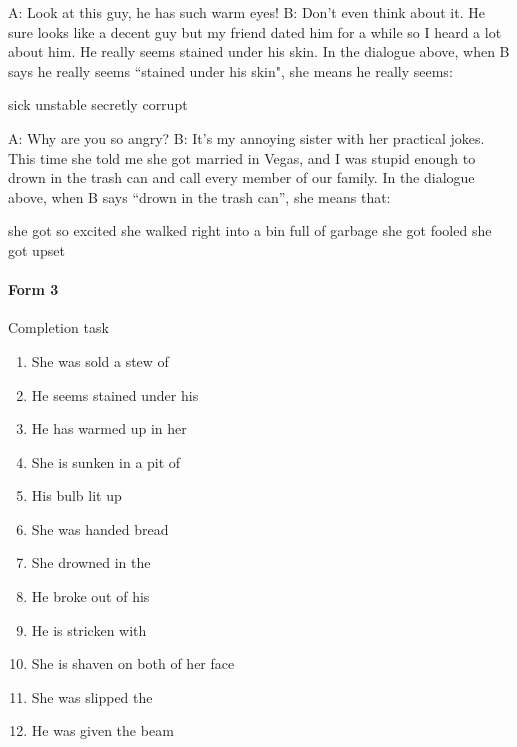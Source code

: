 \documentclass[output=paper]{langsci/langscibook}
\begin{document}
\begin{subappendices}
{\begin{exe}
\begin{xlist}
        \sn A: Look at this guy, he has such warm eyes!
        \sn B: Don't even think about it. He sure looks like a decent guy but my friend dated him for a while so I heard a lot about him. He really seems stained under his skin.
        \sn In the dialogue above, when B says he really seems “stained under his skin", she means he really seems:
        \begin{xlist}
         sick
         unstable
         secretly corrupt
        \end{xlist}
        \end{xlist}
    \newpage
     \begin{xlist}
        \sn A: Why are you so angry?
        \sn B: It's my annoying sister with her practical jokes. This time she told me she got married in Vegas, and I was stupid enough to drown in the trash can and call every member of our family.
        \sn In the dialogue above, when B says \enquote{drown in the trash can}, she means that:
        \begin{xlist}
         she got so excited she walked right into a bin full of garbage
         she got  fooled
         she got upset
        \end{xlist}
        \end{xlist}
\end{exe}

\paragraph*{Form 3} Completion task
\begin{exe}
    \sn
    \begin{enumerate}
        \item She was sold a stew of \underline{\hphantom{3em}}
        \item He seems stained under his  \underline{\hphantom{3em}}
        \item He has warmed up in her  \underline{\hphantom{3em}}
        \item She is sunken in a pit of  \underline{\hphantom{3em}}
        \item His \underline{\hphantom{3em}} bulb lit up
        \item She was handed   \underline{\hphantom{3em}}  bread
        \item She drowned in the  \underline{\hphantom{3em}}   \underline{\hphantom{3em}}
        \item He  broke out of his  \underline{\hphantom{3em}}
        \item He is stricken with  \underline{\hphantom{3em}}
        \item She is shaven on both  \underline{\hphantom{3em}}  of her face
        \item She was slipped the \underline{\hphantom{3em}}
        \item He was given the \underline{\hphantom{3em}} beam
    \end{enumerate}
\end{exe}

}
\end{subappendices}
\end{document}
